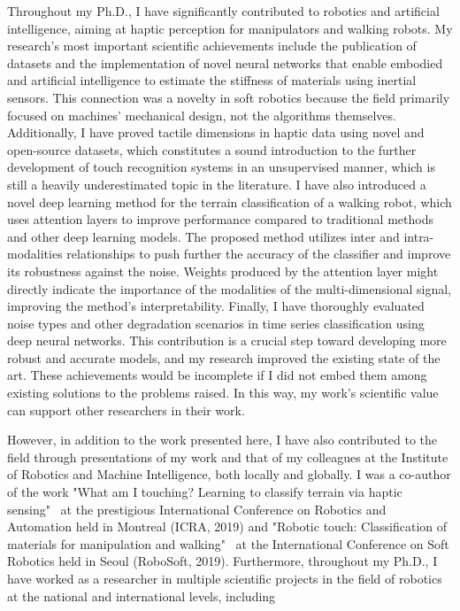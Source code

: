 \documentclass[a4paper, 10pt, twoside]{report}
\begin{document}
Throughout my Ph.D., I have significantly contributed to robotics and artificial intelligence, aiming at haptic perception for manipulators and walking robots. My research's most important scientific achievements include the publication of datasets and the implementation of novel neural networks that enable embodied and artificial intelligence to estimate the stiffness of materials using inertial sensors. This connection was a novelty in soft robotics because the field primarily focused on machines' mechanical design, not the algorithms themselves. Additionally, I have proved tactile dimensions in haptic data using novel and open-source datasets, which constitutes a sound introduction to the further development of touch recognition systems in an unsupervised manner, which is still a heavily underestimated topic in the literature. I have also introduced a novel deep learning method for the terrain classification of a walking robot, which uses attention layers to improve performance compared to traditional methods and other deep learning models. The proposed method utilizes inter and intra-modalities relationships to push further the accuracy of the classifier and improve its robustness against the noise. Weights produced by the attention layer might directly indicate the importance of the modalities of the multi-dimensional signal, improving the method's interpretability. Finally, I have thoroughly evaluated noise types and other degradation scenarios in time series classification using deep neural networks. This contribution is a crucial step toward developing more robust and accurate models, and my research improved the existing state of the art. These achievements would be incomplete if I did not embed them among existing solutions to the problems raised. In this way, my work's scientific value can support other researchers in their work.

However, in addition to the work presented here, I have also contributed to the field through presentations of my work and that of my colleagues at the Institute of Robotics and Machine Intelligence, both locally and globally. I was a co-author of the work "What am I touching? Learning to classify terrain via haptic sensing"~\cite{bednarek2019icra} at the prestigious International Conference on Robotics and Automation held in Montreal (ICRA, 2019) and "Robotic touch: Classification of materials for manipulation and walking"~\cite{bednarek19} at the International Conference on Soft Robotics held in Seoul (RoboSoft, 2019). Furthermore, throughout my Ph.D., I have worked as a researcher in multiple scientific projects in the field of robotics at the national and international levels, including
\end{document}
